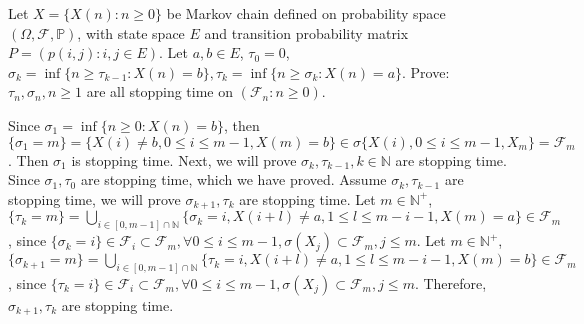 \documentclass{ctexart}
\newif\ifpreface
\begin{document}
\large
\setlength{\baselineskip}{1.2em}
\ifpreface
  
\else
\fi
{}
\begin{problem}\label{pro:1}
  Let \(X=\{X(n): n \geq 0\}\) be Markov chain defined on probability space \((\Omega,\mathscr{F},\mathbb{P})\), with state space \(E\) and
  transition probability matrix \(P=(p(i,j):i,j \in E)\). Let \(a, b \in E\), \(\tau_0 =0\), \(\sigma_k = \inf \{n \geq \tau_{k-1}: X(n)=b\}, \tau_k=\inf\{n \geq \sigma_{k}: X(n)=a\}\).
  Prove: \(\tau_n,\sigma_n, n \geq 1 \) are all stopping time on \((\mathscr{F}_n: n \geq 0)\).
\end{problem}
\begin{solution}
  Since \(\sigma_1= \inf \{n \geq 0: X(n)=b\}\), then \(\{\sigma_1 = m\} = \{X(i) \neq b, 0 \leq i \leq m-1, X(m)=b\} \in \sigma\{X(i),0 \leq i \leq m-1, X_m\} = \mathscr{F}_m\).
  Then \(\sigma_1\) is stopping time.
  Next, we will prove \(\sigma_k, \tau_{k-1}, k \in \mathbb{N}\) are stopping time. Since \(\sigma_1, \tau_0\) are stopping time, which
  we have proved. Assume \(\sigma_k, \tau_{k-1}\) are stopping time, we will prove \(\sigma_{k + 1}, \tau_{k}\) are stopping time.
  Let \(m \in \mathbb{N}^+\), \(\{\tau_k=m\}=\bigcup_{i \in [0,m-1]\cap \mathbb{N}}\{\sigma_k=i,X(i + l) \neq a, 1 \leq l \leq m-i-1, X(m)=a\}\in \mathscr{F}_m\), since
  \(\{\sigma_k=i\} \in \mathscr{F}_i \subset \mathscr{F}_m, \forall 0 \leq i \leq m-1, \sigma(X_j) \subset \mathscr{F}_m, j \leq m\).
  Let \(m \in \mathbb{N}^+\), \(\{\sigma_{k + 1}=m\}=\bigcup_{i \in [0,m-1]\cap \mathbb{N}}\{\tau_k=i,X(i + l) \neq a, 1 \leq l \leq m-i-1, X(m)=b\}\in \mathscr{F}_m\), since
  \(\{\tau_k=i\} \in \mathscr{F}_i \subset \mathscr{F}_m, \forall 0 \leq i \leq m-1, \sigma(X_j) \subset \mathscr{F}_m, j \leq m\).
  Therefore, \(\sigma_{k + 1}, \tau_k\) are stopping time.
\end{solution}
\end{document}
